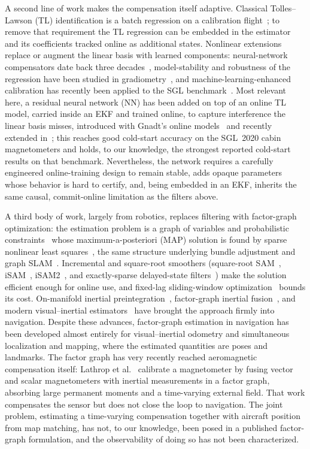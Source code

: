 \documentclass{IEEEtaes}
\begin{document}
A second line of work makes the compensation itself adaptive. Classical
Tolles--Lawson (TL) identification is a batch regression on a calibration
flight~\cite{tolles1950,leliak1961,bickel1979}; to remove that requirement the TL
regression can be embedded in the estimator and its coefficients tracked online as
additional states. Nonlinear extensions replace or augment the linear basis with
learned components: neural-network compensators date back three
decades~\cite{williams1993}, model-stability and robustness of the regression have
been studied in gradiometry~\cite{noriega2015}, and machine-learning-enhanced
calibration has recently been applied to the SGL benchmark~\cite{gnadt2022}. Most
relevant here, a residual neural network (NN) has been added on top of an online TL
model, carried inside an EKF and trained online, to capture interference the linear
basis misses, introduced with Gnadt's online models~\cite{gnadt2022} and recently
extended in~\cite{hager2026}; this reaches good cold-start accuracy on the SGL~2020
cabin magnetometers and holds, to our knowledge, the strongest reported cold-start
results on that benchmark. Nevertheless, the network requires a carefully
engineered online-training design to remain stable, adds opaque parameters whose
behavior is hard to certify, and, being embedded in an EKF, inherits the same
causal, commit-online limitation as the filters above.

A third body of work, largely from robotics, replaces filtering with factor-graph
optimization: the estimation problem is a graph of variables and probabilistic
constraints~\cite{kschischang2001} whose maximum-a-posteriori (MAP) solution is
found by sparse nonlinear least squares~\cite{dellaert2017,dellaert2012}, the same
structure underlying bundle adjustment and graph SLAM~\cite{triggs2000,grisetti2010,kummerle2011}.
Incremental and square-root smoothers (square-root
SAM~\cite{dellaert2006}, iSAM~\cite{kaess2008}, iSAM2~\cite{kaess2012}, and
exactly-sparse delayed-state filters~\cite{eustice2006}) make the solution
efficient enough for online use, and fixed-lag sliding-window
optimization~\cite{sibley2010,leutenegger2015} bounds its cost. On-manifold inertial
preintegration~\cite{forster2017}, factor-graph inertial
fusion~\cite{indelman2013}, and modern visual--inertial estimators~\cite{qin2018}
have brought the approach firmly into navigation. Despite these advances,
factor-graph estimation in navigation has been developed almost entirely for
visual--inertial odometry and simultaneous localization and mapping, where the
estimated quantities are poses and landmarks. The factor graph has very recently
reached aeromagnetic compensation itself: Lathrop et al.~\cite{lathrop2024}
calibrate a magnetometer by fusing vector and scalar magnetometers with inertial
measurements in a factor graph, absorbing large permanent moments and a
time-varying external field. That work compensates the sensor but does not close
the loop to navigation. The joint problem, estimating a time-varying compensation
together with aircraft position from map matching, has not, to our knowledge, been
posed in a published factor-graph formulation, and the observability of doing so has
not been characterized.
\end{document}
